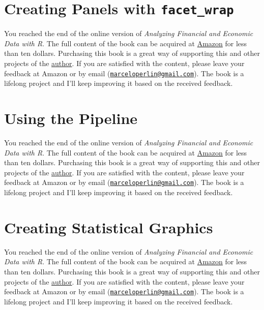 \documentclass[
  12pt,
]{book}
\newenvironment{pleasebuyit}
{\begin{noteblock}
		
	} {\end{noteblock}}
\begin{document}
\hypertarget{creating-panels-with-facet_wrap}{%
\section{\texorpdfstring{Creating Panels with \texttt{facet\_wrap}}{Creating Panels with facet\_wrap}}\label{creating-panels-with-facet_wrap}}

\begin{pleasebuyit}
You reached the end of the online version of \emph{Analyzing Financial
and Economic Data with R}. The full content of the book can be acquired
at \href{https://www.amazon.com/dp/B084LSNXMN}{Amazon} for less than ten
dollars. Purchasing this book is a great way of supporting this and
other projects of the \href{https://www.msperlin.com/blog/}{author}. If
you are satisfied with the content, please leave your feedback at Amazon
or by email
(\href{mailto:marceloperlin@gmail.com}{\nolinkurl{marceloperlin@gmail.com}}).
The book is a lifelong project and I'll keep improving it based on the
received feedback.
\end{pleasebuyit}

\hypertarget{using-the-pipeline}{%
\section{Using the Pipeline}\label{using-the-pipeline}}

\begin{pleasebuyit}
You reached the end of the online version of \emph{Analyzing Financial
and Economic Data with R}. The full content of the book can be acquired
at \href{https://www.amazon.com/dp/B084LSNXMN}{Amazon} for less than ten
dollars. Purchasing this book is a great way of supporting this and
other projects of the \href{https://www.msperlin.com/blog/}{author}. If
you are satisfied with the content, please leave your feedback at Amazon
or by email
(\href{mailto:marceloperlin@gmail.com}{\nolinkurl{marceloperlin@gmail.com}}).
The book is a lifelong project and I'll keep improving it based on the
received feedback.
\end{pleasebuyit}

\hypertarget{creating-statistical-graphics}{%
\section{Creating Statistical Graphics}\label{creating-statistical-graphics}}

\begin{pleasebuyit}
You reached the end of the online version of \emph{Analyzing Financial
and Economic Data with R}. The full content of the book can be acquired
at \href{https://www.amazon.com/dp/B084LSNXMN}{Amazon} for less than ten
dollars. Purchasing this book is a great way of supporting this and
other projects of the \href{https://www.msperlin.com/blog/}{author}. If
you are satisfied with the content, please leave your feedback at Amazon
or by email
(\href{mailto:marceloperlin@gmail.com}{\nolinkurl{marceloperlin@gmail.com}}).
The book is a lifelong project and I'll keep improving it based on the
received feedback.
\end{pleasebuyit}
\end{document}
